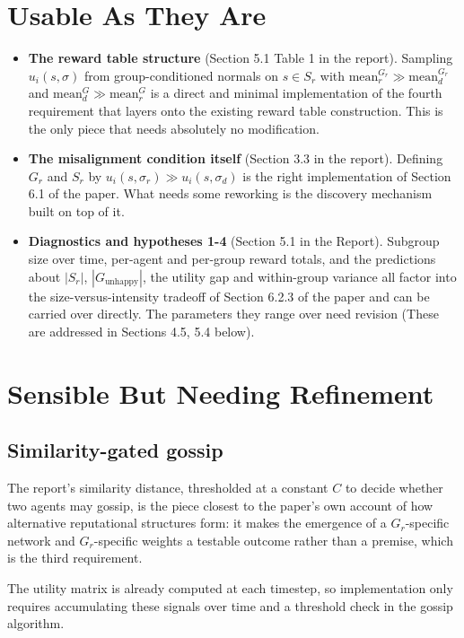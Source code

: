 \documentclass[12pt]{article}
\begin{document}
\section{Usable As They Are}
\begin{itemize}
    \item \textbf{The reward table structure} (Section 5.1 Table 1 in the report). Sampling $u_i(s, \sigma)$
    from group-conditioned normals on $s \in S_r$ with $\text{mean}_r^{G_r} \gg \text{mean}_d^{G_r}$ and $\text{mean}_d^G \gg \text{mean}_r^G$
    is a direct and minimal implementation of the fourth requirement that layers onto the existing reward table construction. This is the only piece
    that needs absolutely no modification.
    \item \textbf{The misalignment condition itself} (Section 3.3 in the report). Defining $G_r$ and $S_r$
    by $u_i(s, \sigma_r) \gg u_i(s, \sigma_d)$ is the right implementation of Section 6.1 of the paper. What needs some reworking
    is the discovery mechanism built on top of it.
    \item \textbf{Diagnostics and hypotheses 1-4} (Section 5.1 in the Report). Subgroup size over time, per-agent and per-group reward totals,
    and the predictions about $|S_r|$, $|G_{\text{unhappy}}|$, the utility gap and within-group variance all
    factor into the size-versus-intensity tradeoff of Section 6.2.3 of the paper and can be carried over directly. The parameters
    they range over need revision (These are addressed in Sections 4.5, 5.4 below).
\end{itemize}

\section{Sensible But Needing Refinement}

\subsection{Similarity-gated gossip}
The report's similarity distance, thresholded at a constant $C$ to decide whether two agents may gossip,
is the piece closest to the paper's own account of how alternative reputational structures form: it makes
the emergence of a $G_r$-specific network and $G_r$-specific weights a testable outcome
rather than a premise, which is the third requirement.

The utility matrix is already computed at each timestep, so implementation only requires accumulating these signals over time
and a threshold check in the gossip algorithm.
\end{document}

